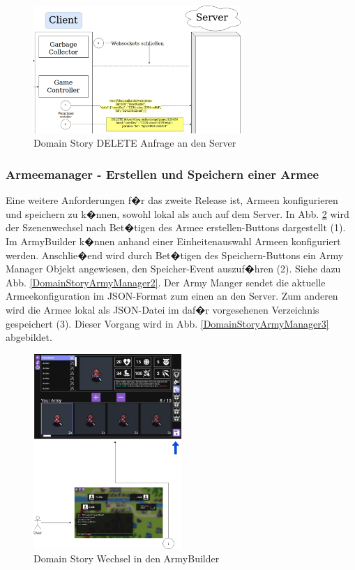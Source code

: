 \documentclass[12pt, titlepage]{scrartcl}
\begin{document}
		\begin{figure}[H] 
			\centering
			\includegraphics[width=0.7\textwidth]{BackToLobby3.png}
			\caption{Domain Story DELETE Anfrage an den Server}
			\label{DomainStoryZurueckDelete}
		\end{figure} 
		\subsubsection{Armeemanager - Erstellen und Speichern einer Armee}
		Eine weitere Anforderungen f�r das zweite Release ist, Armeen konfigurieren und speichern zu k�nnen, sowohl lokal als auch auf dem Server. In Abb. \ref{DomainStoryArmyManager1} wird der Szenenwechsel nach Bet�tigen des Armee erstellen-Buttons dargestellt (1). Im ArmyBuilder k�nnen anhand einer Einheitenauswahl Armeen konfiguriert werden. Anschlie�end wird durch Bet�tigen des Speichern-Buttons ein Army Manager Objekt angewiesen, den Speicher-Event auszuf�hren (2). Siehe dazu Abb. \ref{DomainStoryArmyManager2}. Der Army Manger sendet die aktuelle Armeekonfiguration im JSON-Format zum einen an den Server. Zum anderen wird die Armee lokal als JSON-Datei im daf�r vorgesehenen Verzeichnis gespeichert (3). Dieser Vorgang wird in Abb. \ref{DomainStoryArmyManager3} abgebildet.
			\begin{figure}[H] 
				\centering
				\includegraphics[width=0.5\textwidth]{ArmyManager1.png}
				\caption{Domain Story Wechsel in den ArmyBuilder}
				\label{DomainStoryArmyManager1}
			\end{figure}
\end{document}
